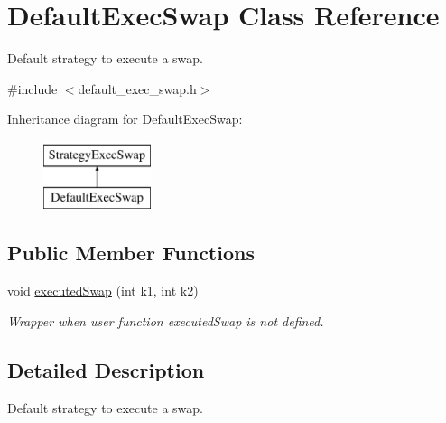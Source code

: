 \hypertarget{classDefaultExecSwap}{\section{\-Default\-Exec\-Swap \-Class \-Reference}
\label{classDefaultExecSwap}
}


\-Default strategy to execute a swap.  




{\ttfamily \#include $<$default\-\_\-exec\-\_\-swap.\-h$>$}

\-Inheritance diagram for \-Default\-Exec\-Swap\-:\begin{figure}[H]
\begin{center}
\leavevmode
\includegraphics[height=2.000000cm]{classDefaultExecSwap}
\end{center}
\end{figure}
\subsection*{\-Public \-Member \-Functions}
\begin{DoxyCompactItemize}
\item 
void \hyperlink{classDefaultExecSwap_a97353521524f73e025572e1cab5b6b14}{executed\-Swap} (int k1, int k2)
\begin{DoxyCompactList}\small\item\em \-Wrapper when user function executed\-Swap is not defined. \end{DoxyCompactList}\end{DoxyCompactItemize}


\subsection{\-Detailed \-Description}
\-Default strategy to execute a swap. 

